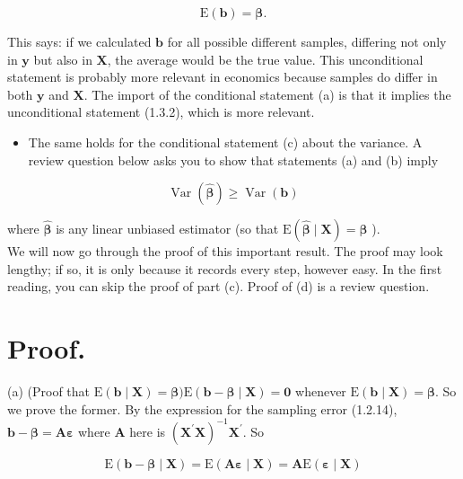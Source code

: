 \documentclass[10pt]{article}
\begin{document}
\begin{equation*}
\mathrm{E}(\mathbf{b})=\boldsymbol{\beta} . \tag{1.3.2}
\end{equation*}


This says: if we calculated $\mathbf{b}$ for all possible different samples, differing not only in $\mathbf{y}$ but also in $\mathbf{X}$, the average would be the true value. This unconditional statement is probably more relevant in economics because samples do differ in both $\mathbf{y}$ and $\mathbf{X}$. The import of the conditional statement (a) is that it implies the unconditional statement (1.3.2), which is more relevant.

\begin{itemize}
  \item The same holds for the conditional statement (c) about the variance. A review question below asks you to show that statements (a) and (b) imply
\end{itemize}


\begin{equation*}
\operatorname{Var}(\widehat{\boldsymbol{\beta}}) \geq \operatorname{Var}(\mathbf{b}) \tag{1.3.3}
\end{equation*}


where $\widehat{\boldsymbol{\beta}}$ is any linear unbiased estimator (so that $\mathrm{E}(\widehat{\boldsymbol{\beta}} \mid \mathbf{X})=\boldsymbol{\beta}$ ).\\
We will now go through the proof of this important result. The proof may look lengthy; if so, it is only because it records every step, however easy. In the first reading, you can skip the proof of part (c). Proof of (d) is a review question.

\section*{Proof.}
(a) (Proof that $\mathrm{E}(\mathbf{b} \mid \mathbf{X})=\boldsymbol{\beta}) \mathrm{E}(\mathbf{b}-\boldsymbol{\beta} \mid \mathbf{X})=\mathbf{0}$ whenever $\mathrm{E}(\mathbf{b} \mid \mathbf{X})=\boldsymbol{\beta}$. So we prove the former. By the expression for the sampling error (1.2.14),\\
$\mathbf{b}-\boldsymbol{\beta}=\mathbf{A} \boldsymbol{\varepsilon}$ where $\mathbf{A}$ here is $\left(\mathbf{X}^{\prime} \mathbf{X}\right)^{-1} \mathbf{X}^{\prime}$. So

$$
\mathrm{E}(\mathbf{b}-\boldsymbol{\beta} \mid \mathbf{X})=\mathrm{E}(\mathbf{A} \boldsymbol{\varepsilon} \mid \mathbf{X})=\mathbf{A} \mathrm{E}(\boldsymbol{\varepsilon} \mid \mathbf{X})
$$
\end{document}
